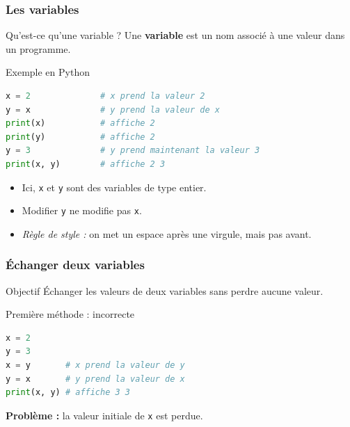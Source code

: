 \documentclass[10pt]{beamer}
\begin{document}
\begin{frame}[containsverbatim]
\frametitle{Les variables}

\begin{block}{Qu'est-ce qu'une variable ?}
	Une \textbf{variable} est un nom associé à une valeur dans un programme.
\end{block}
	
	\vspace{0.25cm}

\begin{exampleblock}{Exemple en Python}
\begin{lstlisting}[language=Python]
x = 2              # x prend la valeur 2
y = x              # y prend la valeur de x
print(x)           # affiche 2
print(y)           # affiche 2
y = 3              # y prend maintenant la valeur 3
print(x, y)        # affiche 2 3
\end{lstlisting}
\end{exampleblock}

\vspace{0.15cm}
\begin{center}
	 \begin{itemize}
	 	\item Ici, \texttt{x} et \texttt{y} sont des variables de type entier.
	 	\item Modifier \texttt{y} ne modifie pas \texttt{x}.
	 	\item \textit{Règle de style :} on met un espace après une virgule, mais pas avant.
	 \end{itemize}

\end{center}
\end{frame}
\begin{frame}[containsverbatim]
\frametitle{Échanger deux variables}
\begin{block}{Objectif}
Échanger les valeurs de deux variables sans perdre aucune valeur.
\end{block}

\vspace{0.25cm}

\begin{exampleblock}{Première méthode : incorrecte}
\begin{lstlisting}[language=Python]
x = 2
y = 3
x = y       # x prend la valeur de y
y = x       # y prend la valeur de x
print(x, y) # affiche 3 3
\end{lstlisting}
\end{exampleblock}
\vspace{0.15cm}
\begin{center}
\textbf{Problème :} la valeur initiale de \texttt{x} est perdue.
\end{center}
\end{frame}
\end{document}
